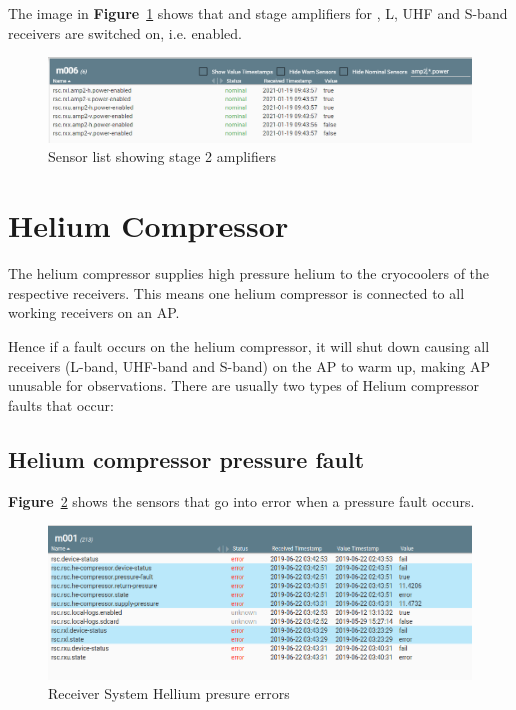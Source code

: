 The image in \textbf{Figure}~\ref{fig:image51} shows that and stage amplifiers for , L, UHF and S-band receivers are switched on, i.e. enabled.

\begin{figure}[!thb]
	\centering
	
	\includegraphics[scale=0.4]{Chapters/images/image51.png}
	
	\caption{Sensor list showing stage 2 amplifiers}
	\label{fig:image51}
\end{figure} 

\section{ Helium Compressor}
The helium compressor supplies high pressure helium to the cryocoolers of the respective receivers. This means one helium compressor is connected to all working receivers on an AP. 

Hence if a fault occurs on the helium compressor, it will shut down causing all receivers (L-band, UHF-band and S-band) on the AP to warm up, making AP unusable for observations. There are usually two types of Helium compressor faults that occur:
\subsection{ Helium compressor pressure fault}
\textbf{Figure}~\ref{fig:He1} shows the sensors that go into error when a pressure fault occurs.

\begin{figure}[!thb]
	\centering
	\includegraphics[scale=0.45]{Chapters/images/He1.png}
	
	\caption{Receiver System Hellium presure errors}
	\label{fig:He1}
\end{figure}
